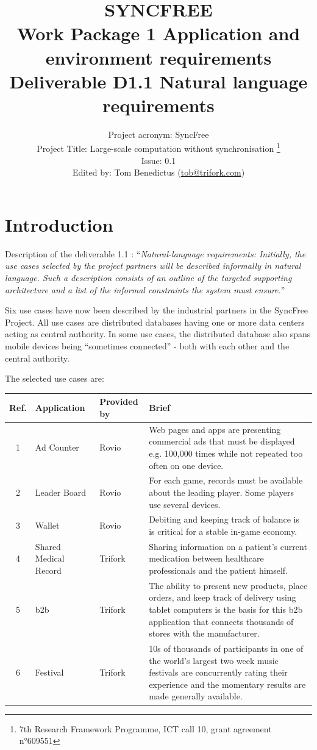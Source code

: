 \documentclass[11pt,a4paper]{report}
\title{{\Huge SYNCFREE} \\ Work Package 1 Application and environment requirements \\ Deliverable D1.1 Natural language requirements}
\author{Project acronym: SyncFree\\Project Title: Large-scale computation without synchronisation \thanks{7th Research Framework Programme, ICT call 10, grant agreement n°609551}\\Issue: 0.1\\Edited by: Tom Benedictus (\href{mailto:tob@trifork.com}{tob@trifork.com})}
\begin{document}
\maketitle

\newpage

\tableofcontents{}

\chapter{Introduction}

Description of the deliverable 1.1 : ``{\em Natural-language
  requirements: Initially, the use cases selected by the project
  partners will be described informally in natural language. Such a
  description consists of an outline of the targeted supporting
  architecture and a list of the informal constraints the system must
  ensure.}''

Six use cases have now been described by the industrial partners in
the SyncFree Project. All use cases are distributed databases having
one or more data centers acting as central authority.
In some use cases, the distributed database also spans mobile devices
being ``sometimes connected'' - both with each other and the central
authority.

The selected use cases are:
\begin{table}[htb] \centering
		\begin{tabular}{| c | l | l | p{8.5cm} |}
			\hline
			Ref. & Application & Provided by & Brief \\ \hline
			1 & Ad Counter & Rovio & Web pages and apps are presenting commercial ads that must be displayed e.g. 100,000 times while not repeated too often on one device.\\ \hline
			2 & Leader Board & Rovio & For each game, records must be available about the leading player. Some players use several devices. \\ \hline
			3 & Wallet & Rovio & Debiting and keeping track of balance is is critical for a stable in-game economy. \\ \hline
			4 & Shared Medical Record & Trifork & Sharing information on a patient's current medication between healthcare professionals and the patient himself. \\ \hline
			5 & \gls{b2b} & Trifork & The ability to present new products, place orders, and keep track of delivery using tablet computers is the basis for this \gls{b2b} application that connects thousands of stores with the manufacturer. \\ \hline
			6 & Festival & Trifork & 10s of thousands of participants in one of the world's largest two week music festivals are concurrently rating their experience and the momentary results are made generally available. \\ \hline
		\end{tabular}
\end{table}
              
\end{document}
